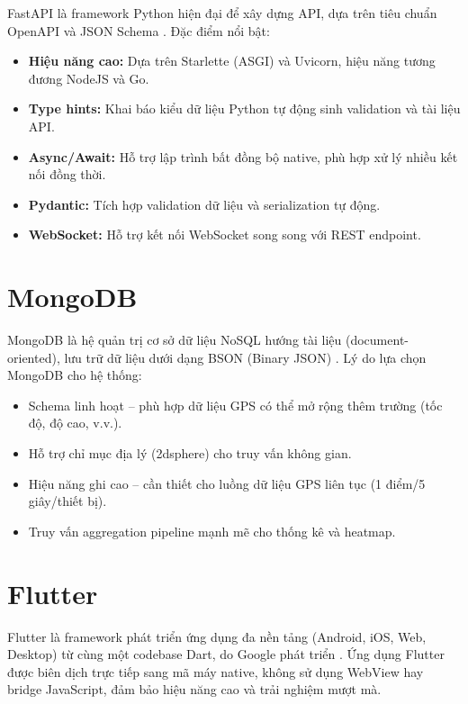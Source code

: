 FastAPI là framework Python hiện đại để xây dựng API, dựa trên tiêu chuẩn OpenAPI và JSON Schema \cite{ramirez2021fastapi}. Đặc điểm nổi bật:

\begin{itemize}
  \item \textbf{Hiệu năng cao:} Dựa trên Starlette (ASGI) và Uvicorn, hiệu năng tương đương NodeJS và Go.
  \item \textbf{Type hints:} Khai báo kiểu dữ liệu Python tự động sinh validation và tài liệu API.
  \item \textbf{Async/Await:} Hỗ trợ lập trình bất đồng bộ native, phù hợp xử lý nhiều kết nối đồng thời.
  \item \textbf{Pydantic:} Tích hợp validation dữ liệu và serialization tự động.
  \item \textbf{WebSocket:} Hỗ trợ kết nối WebSocket song song với REST endpoint.
\end{itemize}

\section{MongoDB}

MongoDB là hệ quản trị cơ sở dữ liệu NoSQL hướng tài liệu (document-oriented), lưu trữ dữ liệu dưới dạng BSON (Binary JSON) \cite{banker2011mongodb}. Lý do lựa chọn MongoDB cho hệ thống:

\begin{itemize}[noitemsep]
  \item Schema linh hoạt -- phù hợp dữ liệu GPS có thể mở rộng thêm trường (tốc độ, độ cao, v.v.).
  \item Hỗ trợ chỉ mục địa lý (2dsphere) cho truy vấn không gian.
  \item Hiệu năng ghi cao -- cần thiết cho luồng dữ liệu GPS liên tục (1 điểm/5 giây/thiết bị).
  \item Truy vấn aggregation pipeline mạnh mẽ cho thống kê và heatmap.
\end{itemize}

\section{Flutter}

Flutter là framework phát triển ứng dụng đa nền tảng (Android, iOS, Web, Desktop) từ cùng một codebase Dart, do Google phát triển \cite{flutter2023}. Ứng dụng Flutter được biên dịch trực tiếp sang mã máy native, không sử dụng WebView hay bridge JavaScript, đảm bảo hiệu năng cao và trải nghiệm mượt mà.

